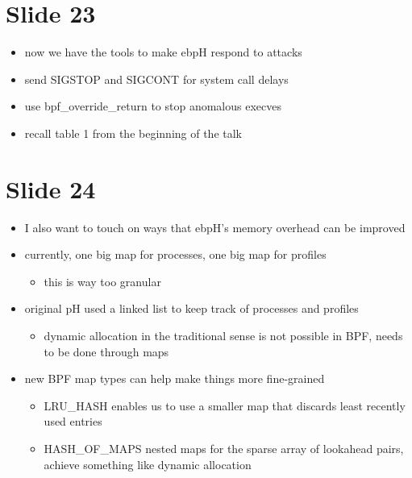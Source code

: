 \documentclass[
  12pt]{findlay}
\providecommand{\tightlist}{\setlength{\itemsep}{0pt}\setlength{\parskip}{0pt}}
\begin{document}
\hypertarget{slide-23}{%
\section{Slide 23}\label{slide-23}}

\begin{itemize}
\tightlist
\item
  now we have the tools to make ebpH respond to attacks
\item
  send SIGSTOP and SIGCONT for system call delays
\item
  use bpf\_override\_return to stop anomalous execves
\item
  recall table 1 from the beginning of the talk
\end{itemize}

\hypertarget{slide-24}{%
\section{Slide 24}\label{slide-24}}

\begin{itemize}
\tightlist
\item
  I also want to touch on ways that ebpH's memory overhead can be
  improved
\item
  currently, one big map for processes, one big map for profiles

  \begin{itemize}
  \tightlist
  \item
    this is way too granular
  \end{itemize}
\item
  original pH used a linked list to keep track of processes and profiles

  \begin{itemize}
  \tightlist
  \item
    dynamic allocation in the traditional sense is not possible in BPF,
    needs to be done through maps
  \end{itemize}
\item
  new BPF map types can help make things more fine-grained

  \begin{itemize}
  \tightlist
  \item
    LRU\_HASH enables us to use a smaller map that discards least
    recently used entries
  \item
    HASH\_OF\_MAPS nested maps for the sparse array of lookahead pairs,
    achieve something like dynamic allocation
  \end{itemize}
\end{itemize}
\end{document}
